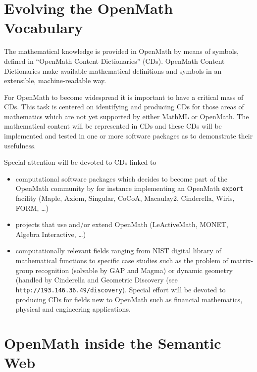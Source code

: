 \documentclass[draft]{artikel3}
\begin{document}
\section{Evolving the OpenMath Vocabulary}
\label{sec:OCD}

The mathematical knowledge is provided in OpenMath by means of
symbols, defined in ``OpenMath Content Dictionaries'' (CDs).  OpenMath
Content Dictionaries make available mathematical definitions and
symbols in an extensible, machine-readable way.

For OpenMath to become widespread it is important to have a critical
mass of CDs. This task is centered on identifying and producing CDs
for those areas of mathematics which are not yet supported by either
MathML or OpenMath. The mathematical content will be represented in
CDs and these CDs will be implemented and tested in one or more
software packages as to demonstrate their usefulness.

Special attention will be devoted to CDs linked to 
\begin{itemize}
  
\item computational software packages which decides to become part of
  the OpenMath community by for instance implementing an OpenMath
  \texttt{export} facility (Maple, Axiom, Singular, CoCoA, Macaulay2,
  Cinderella, Wiris, FORM, \ldots)
  
\item projects that use and/or extend OpenMath (LeActiveMath, MONET,
  Algebra Interactive, \ldots)
  
\item computationally relevant fields ranging from NIST digital
  library of mathematical functions to specific case studies such as
  the problem of matrix-group recognition (solvable by GAP and Magma)
  or dynamic geometry (handled by Cinderella and Geometric Discovery
(see \verb`http://193.146.36.49/discovery`). Special
  effort will be devoted to producing CDs for fields new to OpenMath
  such as financial mathematics, physical and engineering
  applications.

\end{itemize}






\section{OpenMath inside the Semantic Web}
\end{document}
